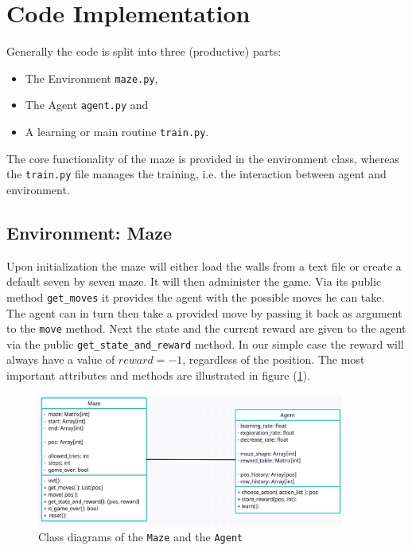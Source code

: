 \documentclass[12pt,a4paper]{scrartcl}
\begin{document}
\section{Code Implementation}
\label{sec:implementation}

Generally the code is split into three (productive) parts:
\begin{itemize}
    \item The Environment \texttt{maze.py},
    \item The Agent \texttt{agent.py} and
    \item A learning or main routine \texttt{train.py}.
\end{itemize}

The core functionality of the maze is provided in the environment class,
whereas the \texttt{train.py} file manages the training, i.e. the interaction
between agent and environment.

\subsection{Environment: Maze}
\label{sec:maze}

Upon initialization the maze will either load the walls from a text file or 
create a default seven by seven maze.
It will then administer the game.
Via its public method \texttt{get\_moves} it provides the agent with
the possible moves he can take. The agent can in turn then take a provided 
move by passing it back as argument to the \texttt{move} method.
Next the state and the current reward are given to the agent via the
public \texttt{get\_state\_and\_reward} method. In our simple case the reward
will always have a value of $reward = -1$, regardless of the position. 
The most important attributes and methods are illustrated in 
figure (\ref{fig:class_diagrams}).

\begin{figure}
    \centering
    \includegraphics[width=0.9\textwidth]{class_diagrams.png}
    \caption{Class diagrams of the \texttt{Maze} and the \texttt{Agent}}
    \label{fig:class_diagrams}
\end{figure}
\end{document}
